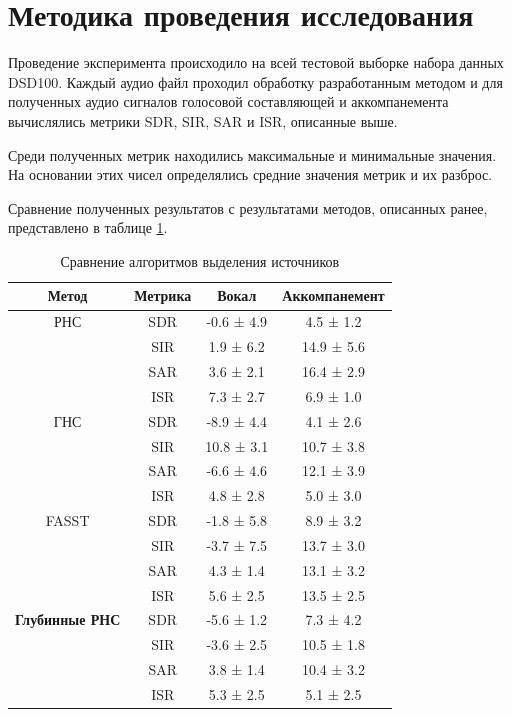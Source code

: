 \section{Методика проведения исследования}

Проведение эксперимента происходило на всей тестовой выборке набора данных DSD100. Каждый аудио файл проходил обработку разработанным методом и для полученных аудио сигналов голосовой составляющей и аккомпанемента вычислялись метрики SDR, SIR, SAR и ISR, описанные выше.

Среди полученных метрик находились максимальные и минимальные значения. На основании этих чисел определялись средние значения метрик и их разброс.

Сравнение полученных результатов с результатами методов, описанных ранее, представлено в таблице \ref{res:canonsummary}.

\begin{table}[h]
	\caption{\label{res:canonsummary}Сравнение алгоритмов выделения источников}
	\begin{center}
		\begin{tabular}{|c|c|c|c|}
			\hline
			Метод & Метрика & Вокал & Аккомпанемент \\
			\hline
			РНС & SDR & -0.6 ± 4.9 & 4.5 ± 1.2 \\
			& SIR & 1.9 ± 6.2 & 14.9 ± 5.6 \\
			& SAR & 3.6 ± 2.1 & 16.4 ± 2.9 \\
			& ISR & 7.3 ± 2.7 & 6.9 ± 1.0 \\
			\hline
			ГНС & SDR & -8.9 ± 4.4 & 4.1 ± 2.6 \\
			& SIR & 10.8 ± 3.1 & 10.7 ± 3.8 \\
			& SAR & -6.6 ± 4.6 & 12.1 ± 3.9 \\
			& ISR & 4.8 ± 2.8 & 5.0 ± 3.0 \\
			\hline
			FASST & SDR & -1.8 ± 5.8 & 8.9 ± 3.2 \\
			& SIR & -3.7 ± 7.5 & 13.7 ± 3.0 \\
			& SAR & 4.3 ± 1.4 & 13.1 ± 3.2 \\
			& ISR & 5.6 ± 2.5 & 13.5 ± 2.5 \\
			\hline
			\textbf{Глубинные РНС} & SDR & -5.6 ± 1.2 & 7.3 ± 4.2 \\
			& SIR & -3.6 ± 2.5 & 10.5 ± 1.8 \\
			& SAR & 3.8 ± 1.4 & 10.4 ± 3.2 \\
			& ISR & 5.3 ± 2.5 & 5.1 ± 2.5 \\
			\hline
		\end{tabular}
	\end{center}
\end{table} 

